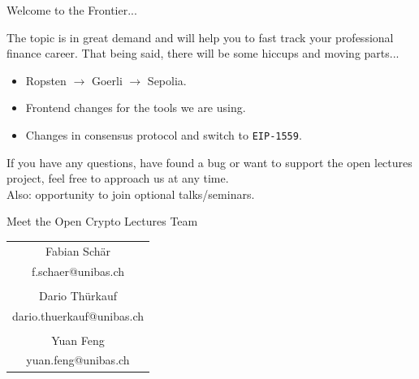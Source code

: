 \documentclass[handout]{beamer}
\begin{document}
\begin{frame}{Welcome to the Frontier...}

The topic is in great demand and will help you to fast track your professional finance career. That being said, there will be \color{focus} some hiccups and moving parts... \color{black} \vspace{1em} 
	\begin{itemize}
		\item Ropsten $\rightarrow$ Goerli $\rightarrow$ Sepolia.
		\item Frontend changes for the tools we are using. 
		\item Changes in consensus protocol and switch to \texttt{EIP-1559}.
	\end{itemize}	
	
	\vspace{2em}
	
If you have any questions, have found a bug or want to support the open lectures project, feel free to approach us at any time. \\

\vspace{1em}
Also: opportunity to join optional talks/seminars.
	
\end{frame}

\begin{frame}{Meet the Open Crypto Lectures Team}

			\begin{table}\small
				\begin{tabular}{c}
					Fabian Schär\\
					f.schaer@unibas.ch\\
					\vspace{1em}\\
					Dario Thürkauf\\
					dario.thuerkauf@unibas.ch\\
					\vspace{1em}\\
					Yuan Feng\\
					yuan.feng@unibas.ch\\
				\end{tabular}
			\end{table}
\end{frame}
\end{document}
